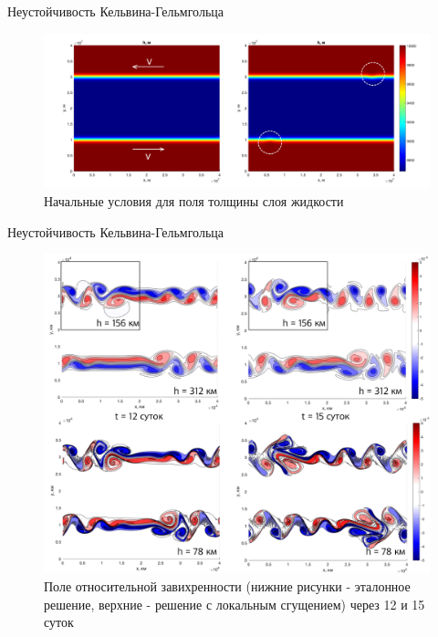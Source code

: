 \documentclass[10pt]{beamer}
\begin{document}
\begin{frame}{Неустойчивость Кельвина-Гельмгольца}

\begin{figure}[h]
\centering
\includegraphics[width=1\linewidth]{./images/initial_cond_kelhelm.png}
\caption{Начальные условия для поля толщины слоя жидкости}
\label{fig:mpr}
\end{figure}

\end{frame}




\begin{frame}{Неустойчивость Кельвина-Гельмгольца}
\begin{figure}[h]
\centering
\includegraphics[width=0.8\linewidth]{./images/kelhelm_full.png}
\caption{Поле относительной завихренности (нижние рисунки - эталонное решение, верхние - решение с локальным сгущением) через 12 и 15 суток}
\label{fig:mpr}
\end{figure}
\end{frame}
\end{document}
